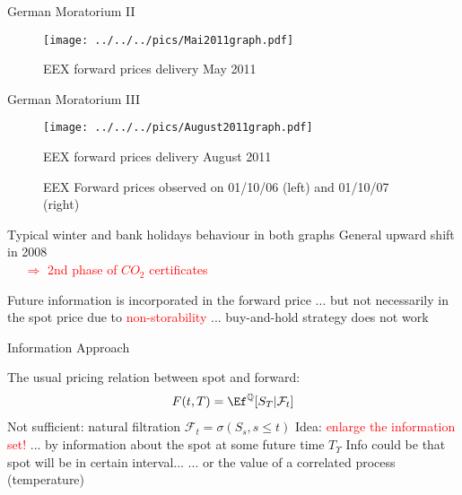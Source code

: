   {German Moratorium II}

\begin{figure}[htbp]
  \texttt{[image: ../../../pics/Mai2011graph.pdf]}
    \caption{EEX forward prices delivery May 2011}
\end{figure}



  {German Moratorium III}

\begin{figure}[htbp]
  \texttt{[image: ../../../pics/August2011graph.pdf]}
    \caption{EEX forward prices delivery August 2011}
\end{figure}


\vspace{-0.5cm}

\begin{figure}[htbp]
  \centering
  \caption{EEX Forward prices observed on 01/10/06 (left) and 01/10/07 (right)}
\end{figure}


 Typical winter and bank holidays behaviour in both graphs
 General upward shift in 2008 \\ \vspace{0.2cm}
\textcolor{red}{$~~~~~~ \Rightarrow$ 2nd phase of $CO_2$ certificates}





 Future information is incorporated in the forward price
 ... but not necessarily in the spot price due to \textcolor{red}{non-storability}
 ... buy-and-hold strategy does not work

%
%




  {Information Approach}
\vspace{-0.5cm}


 The usual pricing relation between spot and forward:
\begin{align*}
F(t,T)=\Ef^\mathbb{Q}[S_T|\mathcal{F}_t]
\end{align*}
 Not sufficient: natural filtration $\mathcal{F}_t = \sigma(S_s, s\leq t)$
\vspace{0.5cm}
\pause
 Idea: \textcolor{red}{enlarge the information set!}
\vspace{0.5cm}
\pause
 ... by information about the spot at some future time $T_\Upsilon$
 Info could be that spot will be in certain interval...
 ... or the value of a correlated process (temperature)





